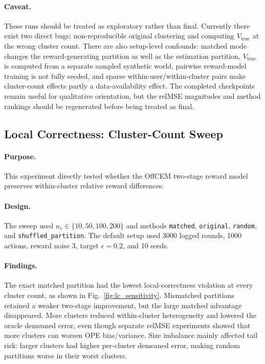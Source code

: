 \documentclass[11pt]{article}
\begin{document}
\paragraph{Caveat.} These runs should be treated as exploratory rather than final. Currently there exist two direct bugs: non-reproducible original clustering and computing $V_{\mathrm{true}}$ at the wrong cluster count. There are also setup-level confounds: matched mode changes the reward-generating partition as well as the estimation partition, $V_{\mathrm{true}}$ is computed from a separate sampled synthetic world, pairwise reward-model training is not fully seeded, and sparse within-user/within-cluster pairs make cluster-count effects partly a data-availability effect. The completed checkpoints remain useful for qualitative orientation, but the relMSE magnitudes and method rankings should be regenerated before being treated as final.

\subsection{Local Correctness: Cluster-Count Sweep}

\paragraph{Purpose.}
This experiment directly tested whether the OffCEM two-stage reward model preserves within-cluster relative reward differences.

\paragraph{Design.}
The sweep used $n_c\in\{10,50,100,200\}$ and methods \texttt{matched}, \texttt{original}, \texttt{random}, and
\texttt{shuffled\_partition}. The default setup used 3000 logged rounds, 1000 actions, reward noise 3, target $\epsilon=0.2$, and 10 seeds.



\paragraph{Findings.}
The exact matched partition had the lowest local-correctness violation at every cluster count, as shown in Fig.~\ref{fig:lc_sensitivity}. Mismatched partitions retained a weaker two-stage improvement, but the large matched advantage disappeared. More clusters reduced within-cluster heterogeneity and lowered the oracle demeaned error, even though separate relMSE experiments showed that more clusters can worsen OPE bias/variance. Size imbalance mainly affected tail risk: larger clusters had higher per-cluster demeaned error, making random partitions worse in their worst clusters.
\end{document}
